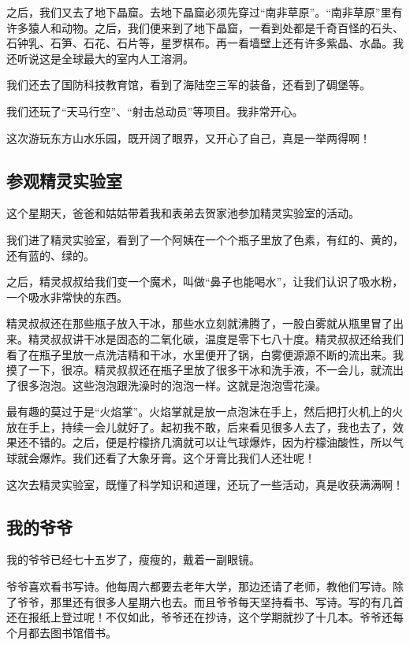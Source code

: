 \documentclass[UTF8,a4paper,titlepage,twoside,10.5pt]{article}
\begin{document}
之后，我们又去了地下晶窟。去地下晶窟必须先穿过“南非草原”。“南非草原”里有许多猿人和动物。之后，我们便来到了地下晶窟，一看到处都是千奇百怪的石头、石钟乳、石笋、石花、石片等，星罗棋布。再一看墙壁上还有许多紫晶、水晶。我还听说这是全球最大的室内人工溶洞。

我们还去了国防科技教育馆，看到了海陆空三军的装备，还看到了碉堡等。

我们还玩了“天马行空”、“射击总动员”等项目。我非常开心。

这次游玩东方山水乐园，既开阔了眼界，又开心了自己，真是一举两得啊！

\subsection{参观精灵实验室}
\label{sec:orgd9a41c0}

这个星期天，爸爸和姑姑带着我和表弟去贺家池参加精灵实验室的活动。

我们进了精灵实验室，看到了一个阿姨在一个个瓶子里放了色素，有红的、黄的，还有蓝的、绿的。

之后，精灵叔叔给我们变一个魔术，叫做“鼻子也能喝水”，让我们认识了吸水粉，一个吸水非常快的东西。

精灵叔叔还在那些瓶子放入干冰，那些水立刻就沸腾了，一股白雾就从瓶里冒了出来。精灵叔叔讲干冰是固态的二氧化碳，温度是零下七八十度。精灵叔叔还给我们看了在瓶子里放一点洗洁精和干冰，水里便开了锅，白雾便源源不断的流出来。我摸了一下，很凉。精灵叔叔还在瓶子里放了很多干冰和洗手液，不一会儿，就流出了很多泡泡。这些泡泡跟洗澡时的泡泡一样。这就是泡泡雪花澡。

最有趣的莫过于是“火焰掌”。火焰掌就是放一点泡沫在手上，然后把打火机上的火放在手上，持续一会儿就好了。起初我不敢，后来看见很多人去了，我也去了，效果还不错的。之后，便是柠檬挤几滴就可以让气球爆炸，因为柠檬油酸性，所以气球就会爆炸。我们还看了大象牙膏。这个牙膏比我们人还壮呢！

这次去精灵实验室，既懂了科学知识和道理，还玩了一些活动，真是收获满满啊！

\subsection{我的爷爷}
\label{sec:org09fcc4f}

我的爷爷已经七十五岁了，瘦瘦的，戴着一副眼镜。

爷爷喜欢看书写诗。他每周六都要去老年大学，那边还请了老师，教他们写诗。除了爷爷，那里还有很多人星期六也去。而且爷爷每天坚持看书、写诗。写的有几首还在报纸上登过呢！不仅如此，爷爷还在抄诗，这个学期就抄了十几本。爷爷还每个月都去图书馆借书。
\end{document}
